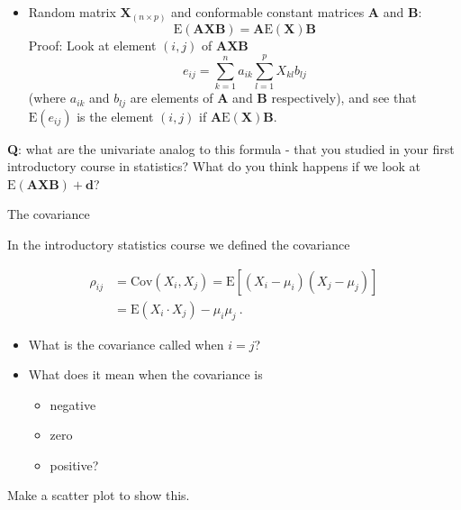 \documentclass[ignorenonframetext,]{beamer}
\providecommand{\tightlist}{%
  \setlength{\itemsep}{0pt}\setlength{\parskip}{0pt}}
\begin{document}
\begin{frame}

\begin{itemize}
\tightlist
\item
  Random matrix \(\boldsymbol{X}_{(n\times p)}\) and conformable
  constant matrices \(\boldsymbol{A}\) and \(\boldsymbol{B}\):
  \[\text{E}(\boldsymbol{A}\boldsymbol{X}\boldsymbol{B})=\boldsymbol{A}\text{E}(\boldsymbol{X})\boldsymbol{B}\]
  Proof: Look at element \((i,j)\) of
  \(\boldsymbol{A}\boldsymbol{X}\boldsymbol{B}\)
  \[e_{ij}=\sum_{k=1}^n a_{ik} \sum_{l=1}^p X_{kl}b_{lj}\] (where
  \(a_{ik}\) and \(b_{lj}\) are elements of \(\boldsymbol{A}\) and
  \(\boldsymbol{B}\) respectively), and see that \(\text{E}(e_{ij})\) is
  the element \((i,j)\) if
  \(\boldsymbol{A}\text{E}(\boldsymbol{X})\boldsymbol{B}\).
\end{itemize}

\textbf{Q}: what are the univariate analog to this formula - that you
studied in your first introductory course in statistics? What do you
think happens if we look at
\(\text{E}(\boldsymbol{A}\boldsymbol{X}\boldsymbol{B})+\boldsymbol{d}\)?

\end{frame}

\begin{frame}

\begin{block}{The covariance}

\vspace{2mm}

In the introductory statistics course we defined the covariance

\begin{align*}
\rho_{ij} & =\text{Cov}(X_i,X_j)  =\text{E}[(X_i-\mu_i)(X_j-\mu_j)] \\
& =\text{E}(X_i \cdot X_j)-\mu_i\mu_j \ . 
\end{align*}

\begin{itemize}
\tightlist
\item
  What is the covariance called when \(i=j\)?
\item
  What does it mean when the covariance is

  \begin{itemize}
  \tightlist
  \item
    negative
  \item
    zero
  \item
    positive?
  \end{itemize}
\end{itemize}

Make a scatter plot to show this.

\end{block}

\end{frame}
\end{document}
